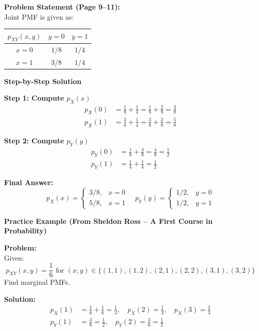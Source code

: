\documentclass[11pt]{article}
\begin{document}
\noindent\textbf{Problem Statement (Page 9–11):}\\
Joint PMF is given as:

\begin{table}[h]
\centering
\begin{tabular}{c|cc}
\toprule
\textbf{$p_{XY}(x,y)$} & \textbf{$y=0$} & \textbf{$y=1$} \\
\midrule
$x=0$ & $1/8$ & $1/4$ \\
$x=1$ & $3/8$ & $1/4$ \\
\bottomrule
\end{tabular}
\end{table}

\noindent\textbf{Step-by-Step Solution}

\noindent \textbf{Step 1: Compute $p_X(x)$}
\begin{align*}
p_X(0) &= \frac{1}{8} + \frac{1}{4} = \frac{1}{8} + \frac{2}{8} = \frac{3}{8} \\[0.2cm]
p_X(1) &= \frac{3}{8} + \frac{1}{4} = \frac{3}{8} + \frac{2}{8} = \frac{5}{8}
\end{align*}

\noindent \textbf{Step 2: Compute $p_Y(y)$}
\begin{align*}
p_Y(0) &= \frac{1}{8} + \frac{3}{8} = \frac{4}{8} = \frac{1}{2} \\[0.2cm]
p_Y(1) &= \frac{1}{4} + \frac{1}{4} = \frac{1}{2}
\end{align*}

\noindent \textbf{Final Answer:}
\[
p_X(x) =
\begin{cases}
3/8, & x=0 \\
5/8, & x=1
\end{cases}
\quad
p_Y(y) =
\begin{cases}
1/2, & y=0 \\
1/2, & y=1
\end{cases}
\]

\vspace{0.5cm}
\noindent\textbf{Practice Example (From Sheldon Ross – A First Course in Probability)}

\noindent\textbf{Problem:}\\
Given:
\[
p_{XY}(x,y)=\frac{1}{6} \text{ for } (x,y)\in\{(1,1),(1,2),(2,1),(2,2),(3,1),(3,2)\}
\]
Find marginal PMFs.

\noindent\textbf{Solution:}
\begin{align*}
p_X(1) &= \frac{1}{6}+\frac{1}{6}=\frac{1}{3}, \quad
p_X(2)=\frac{1}{3}, \quad
p_X(3)=\frac{1}{3} \\[0.2cm]
p_Y(1) &= \frac{3}{6}=\frac{1}{2}, \quad
p_Y(2)=\frac{3}{6}=\frac{1}{2}
\end{align*}
\end{document}
